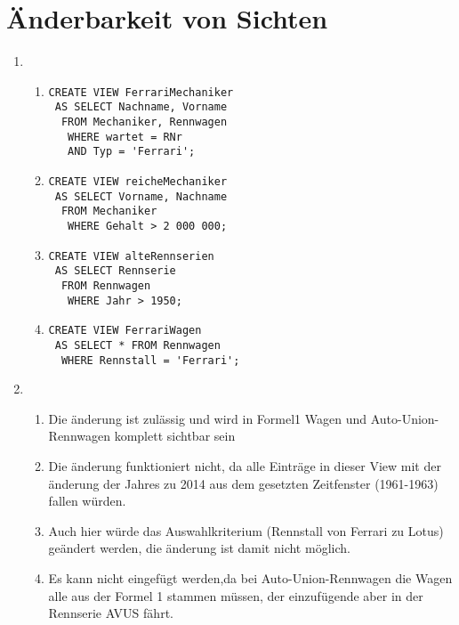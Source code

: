 \documentclass[ngerman]{gdb-aufgabenblatt}
\begin{document}
\section{{\"A}nderbarkeit von Sichten}
\begin{enumerate}
\item
\begin{enumerate}
\item
\begin{verbatim}
CREATE VIEW FerrariMechaniker
 AS SELECT Nachname, Vorname
  FROM Mechaniker, Rennwagen
   WHERE wartet = RNr
   AND Typ = 'Ferrari';
\end{verbatim}
\item
\begin{verbatim}
CREATE VIEW reicheMechaniker
 AS SELECT Vorname, Nachname 
  FROM Mechaniker
   WHERE Gehalt > 2 000 000;
\end{verbatim}
\item
\begin{verbatim}
CREATE VIEW alteRennserien
 AS SELECT Rennserie
  FROM Rennwagen
   WHERE Jahr > 1950;
\end{verbatim}
\item
\begin{verbatim}
CREATE VIEW FerrariWagen
 AS SELECT * FROM Rennwagen
  WHERE Rennstall = 'Ferrari';
\end{verbatim}
\end{enumerate}
\item
\begin{enumerate}
\item
Die {\"a}nderung ist zul{\"a}ssig und wird in Formel1 Wagen und Auto-Union-Rennwagen komplett sichtbar sein
\item
Die {\"a}nderung funktioniert nicht, da alle Eintr{\"a}ge in dieser View mit der {\"a}nderung der Jahres zu 2014 aus dem gesetzten Zeitfenster (1961-1963) fallen w{\"u}rden.
\item
Auch hier w{\"u}rde das Auswahlkriterium (Rennstall von Ferrari zu Lotus) ge{\"a}ndert werden, die {\"a}nderung ist damit nicht m{\"o}glich.
\item
Es kann nicht eingef{\"u}gt werden,da bei Auto-Union-Rennwagen die Wagen alle aus der Formel 1 stammen m{\"u}ssen, der einzuf{\"u}gende aber in der Rennserie AVUS f{\"a}hrt. 
\end{enumerate}
\end{enumerate}
\end{document}
